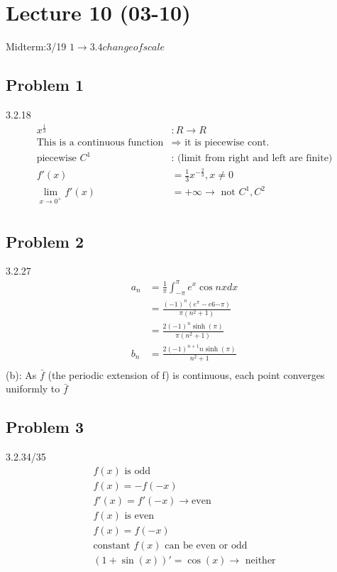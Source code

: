 \section{Lecture 10 (03-10)}
Midterm:3/19  $ 1\rightarrow 3.4 change of scale $ 
\subsection*{Problem 1}
3.2.18
\begin{align*}{}{}
x^{\frac{1}{3}}&:R\rightarrow R\\
\text{This is a continuous function}&\Rightarrow\text{ it is piecewise cont.}\\
\text{piecewise } C^1 &\text{: (limit from right and left are finite)}\\
f'(x)&=\frac{1}{3}x^{-\frac{2}{3}},x\neq0\\
\lim_{x\rightarrow0^+}f'(x)&=+\infty\rightarrow\text{ not } C^1,C^2\\
\end{align*}
\subsection*{Problem 2}
3.2.27
\begin{align*}{}{}
a_n&=\frac{1}{\pi}\int_{-\pi}^{\pi}e^x\cos{nx}dx\\
&=\frac{(-1)^n(e^\pi-e6{-\pi})}{\pi(n^2+1)}\\
&=\frac{2(-1)^n\sinh(\pi)}{\pi(n^2+1)}\\
b_n&=\frac{2(-1)^{n+1}n\sinh(\pi)}{n^2+1}\\
\end{align*}
(b): As $ \bar{f} $ (the periodic extension of f) is continuous, each point converges uniformly to $ \bar{f} $
\subsection*{Problem 3}
3.2.34/35
\begin{align*}{}{}
f(x) \text{ is odd}\\
f(x)=-f(-x)\\
f'(x)=f'(-x)\rightarrow \text{even}\\
f(x) \text{ is even}\\
f(x)=f(-x)\\
\text{constant }f(x) \text{ can be even or odd}\\
(1+\sin(x))'=\cos(x) \rightarrow\text{ neither}
\end{align*}
